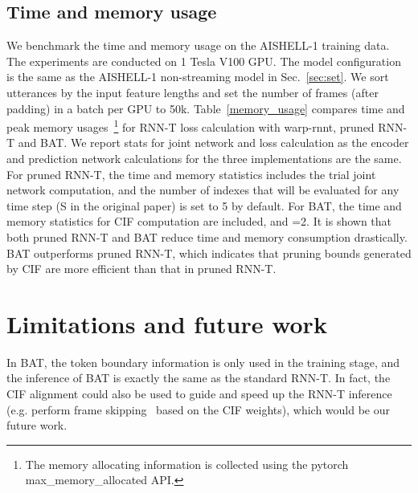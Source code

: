\documentclass{INTERSPEECH2023}
\begin{document}
\subsection{Time and memory usage}
We benchmark the time and memory usage on the AISHELL-1 training data. The experiments are conducted on 1 Tesla V100 GPU. 
The model configuration is the same as the AISHELL-1 non-streaming model in Sec.~\ref{sec:set}. 
We sort utterances by the input feature lengths and set the number of frames (after padding) in a batch per GPU to 50k. 
Table~\ref{memory_usage} compares time and peak memory usages~\footnote{The memory allocating information is collected using the pytorch {max\_memory\_allocated} API.} for RNN-T loss calculation with warp-rnnt, pruned RNN-T and BAT. We report stats for joint network and loss calculation as the encoder and prediction network calculations for the three implementations are the same. For pruned RNN-T, the time and memory statistics includes the trial joint network computation, and the number of indexes that will be evaluated for any time step  (S in the original paper) is set to 5 by default. For BAT, the time and memory statistics for CIF computation are included, and =2. It is shown that both pruned RNN-T and BAT reduce time and memory consumption drastically. BAT outperforms pruned RNN-T, which indicates that pruning bounds generated by CIF are more efficient than that in pruned RNN-T. 
\begin{table}[!ht]
\caption{Time per batch (ms) and peak memory usage (GB) for RNN-T, pruned RNN-T and BAT (=2, =2).}
\begin{threeparttable}
	\centering
\end{threeparttable}
\label{memory_usage}
\end{table}
\section{Limitations and future work}
In BAT, the token boundary information is only used in the training stage, and the inference of BAT is exactly the same as the standard RNN-T. In fact, the CIF alignment could also be used to guide and speed up the RNN-T inference (e.g. perform frame skipping~\cite{tian2021fsr} based on the CIF weights), which would be our future work.
\end{document}
